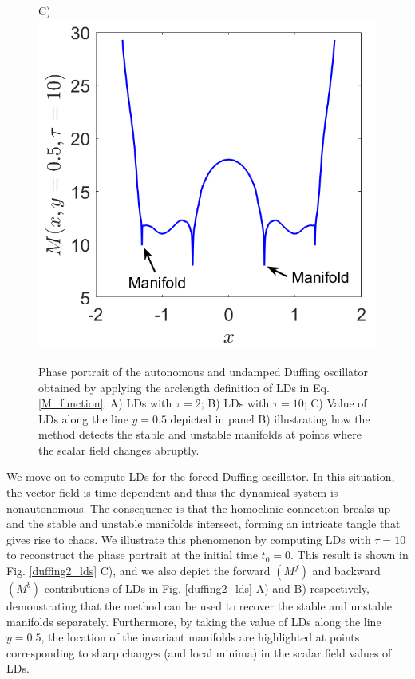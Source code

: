 \documentclass[8pt]{article}
\begin{document}
\begin{figure}[htbp]
\begin{center}
		C)\includegraphics[scale=0.24]{duffing_maniDetect.png}
	\end{center}
	\caption{Phase portrait of the autonomous and undamped Duffing oscillator obtained by applying the arclength definition of LDs in Eq. \eqref{M_function}. A) LDs with $\tau = 2$; B) LDs with $\tau = 10$; C) Value of LDs along the line $y = 0.5$ depicted in panel B) illustrating how the method detects the stable and unstable manifolds at points where the scalar field changes abruptly.}
	\label{duffing1_lds}
\end{figure}

We move on to compute LDs for the forced Duffing oscillator. In this situation, the vector field is time-dependent and thus the dynamical system is nonautonomous. The consequence is that the homoclinic connection breaks up and the stable and unstable manifolds intersect, forming an intricate tangle that gives rise to chaos. We illustrate this phenomenon by computing LDs with $\tau = 10$ to reconstruct the phase portrait at the initial time $t_0 = 0$. This result is shown in Fig. \ref{duffing2_lds} C), and we also depict the forward $(M^f)$ and backward $(M^b)$ contributions of LDs in Fig. \ref{duffing2_lds} A) and B) respectively, demonstrating that the method can be used to recover the stable and unstable manifolds separately. Furthermore, by taking the value of LDs along the line $y = 0.5$, the location of the invariant manifolds are highlighted at points corresponding to sharp changes (and local minima) in the scalar field values of LDs.  
\end{document}
